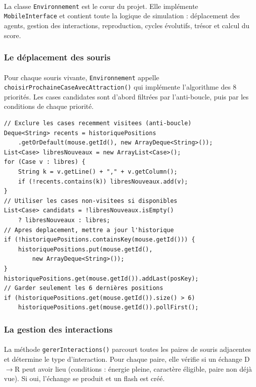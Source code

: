 \paragraph{} La classe \texttt{Environnement} est le cœur du projet. Elle implémente \texttt{MobileInterface} et contient toute la logique de simulation : déplacement des agents, gestion des interactions, reproduction, cycles évolutifs, trésor et calcul du score.

\subsubsection{Le déplacement des souris}

\paragraph{} Pour chaque souris vivante, \texttt{Environnement} appelle \texttt{choisirProchaineCaseAvecAttraction()} qui implémente l'algorithme des 8 priorités. Les cases candidates sont d'abord filtrées par l'anti-boucle, puis par les conditions de chaque priorité.

\begin{lstlisting}[caption={Mécanisme anti-boucle par historique de positions}]
// Exclure les cases recemment visitees (anti-boucle)
Deque<String> recents = historiquePositions
    .getOrDefault(mouse.getId(), new ArrayDeque<String>());
List<Case> libresNouveaux = new ArrayList<Case>();
for (Case v : libres) {
    String k = v.getLine() + "," + v.getColumn();
    if (!recents.contains(k)) libresNouveaux.add(v);
}
// Utiliser les cases non-visitees si disponibles
List<Case> candidats = !libresNouveaux.isEmpty()
    ? libresNouveaux : libres;
// Apres deplacement, mettre a jour l'historique
if (!historiquePositions.containsKey(mouse.getId())) {
    historiquePositions.put(mouse.getId(),
        new ArrayDeque<String>());
}
historiquePositions.get(mouse.getId()).addLast(posKey);
// Garder seulement les 6 dernières positions
if (historiquePositions.get(mouse.getId()).size() > 6)
    historiquePositions.get(mouse.getId()).pollFirst();
\end{lstlisting}

\subsubsection{La gestion des interactions}

\paragraph{} La méthode \texttt{gererInteractions()} parcourt toutes les paires de souris adjacentes et détermine le type d'interaction. Pour chaque paire, elle vérifie si un échange D$\rightarrow$R peut avoir lieu (conditions : énergie pleine, caractère éligible, paire non déjà vue). Si oui, l'échange se produit et un flash est créé.

